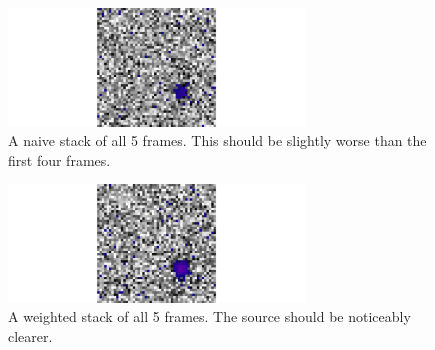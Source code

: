 \documentclass{article}
\begin{document}
\begin{figure}\label{fig:naive}
	\centering
	\includegraphics[width=0.7\textwidth]{../code/figs/naive.pdf}
	\caption{A naive stack of all 5 frames. This should be slightly worse than the first four frames.}
\end{figure}

\begin{figure}\label{fig:weighted}
	\centering
	\includegraphics[width=0.7\textwidth]{../code/figs/weighted.pdf}
	\caption{A weighted stack of all 5 frames. The source should be noticeably clearer.}
\end{figure}
\end{document}
